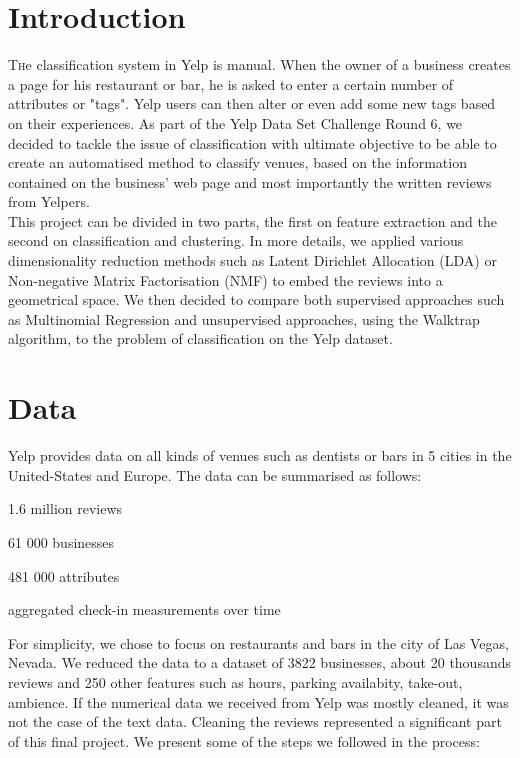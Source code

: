 \documentclass[twoside]{article}
\begin{document}
\begin{multicols}{2} %

\section{Introduction}

\lettrine[nindent=0em,lines=1]{T}he classification system in Yelp is manual. When the owner of a business creates a page for his restaurant or bar, he is asked to enter a certain number of attributes or "tags". Yelp users can then alter or even add some new tags based on their experiences. As part of the Yelp Data Set Challenge Round 6, we decided to tackle the issue of classification with ultimate objective to be able to create an automatised method to classify venues, based on the information contained on the business' web page and most importantly the written reviews from Yelpers. \\

This project can be divided in two parts, the first on feature extraction and the second on classification and clustering. In more details, we applied various dimensionality reduction methods such as Latent Dirichlet Allocation (LDA) or Non-negative Matrix Factorisation (NMF) to embed the reviews into a geometrical space. We then decided to compare both supervised approaches such as Multinomial Regression and unsupervised approaches, using the Walktrap algorithm, to the problem of classification on the Yelp dataset.

\section{Data}

Yelp provides data on all kinds of venues such as dentists or bars in 5 cities in the United-States and Europe. The data can be summarised as follows:

\begin{compactitem}
	\item 1.6 million reviews
	\item 61 000 businesses		
	\item 481 000 attributes 
	\item aggregated check-in measurements over time
\end{compactitem}

\noindent For simplicity, we chose to focus on restaurants and bars in the city of Las Vegas, Nevada. We reduced the data to a dataset of 3822 businesses, about 20 thousands reviews and 250 other features such as hours, parking availabity, take-out, ambience. If the numerical data we received from Yelp was mostly cleaned, it was not the case of the text data. Cleaning the reviews represented a significant part of this final project. We present some of the steps we followed in the process:\\


\end{multicols}
\end{document}
